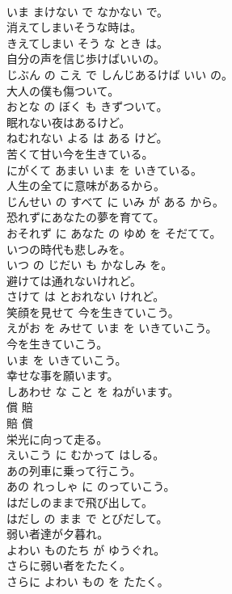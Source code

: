 \documentclass[8pt]{extreport}
\begin{document}
\begin{CJK}{UTF8}{min}
\\	いま まけない で なかない で。	
\\	消えてしまいそうな時は。	
\\	きえてしまい そう な とき は。	
\\	自分の声を信じ歩けばいいの。	
\\	じぶん の こえ で しんじあるけば いい の。	
\\	大人の僕も傷ついて。	
\\	おとな の ぼく も きずついて。	
\\	眠れない夜はあるけど。	
\\	ねむれない よる は ある けど。	
\\	苦くて甘い今を生きている。	
\\	にがくて あまい いま を いきている。	
\\	人生の全てに意味があるから。	
\\	じんせい の すべて に いみ が ある から。	
\\	恐れずにあなたの夢を育てて。	
\\	おそれず に あなた の ゆめ を そだてて。	
\\	いつの時代も悲しみを。	
\\	いつ の じだい も かなしみ を。	
\\	避けては通れないけれど。	
\\	さけて は とおれない けれど。	
\\	笑顔を見せて 今を生きていこう。	
\\	えがお を みせて いま を いきていこう。	
\\	今を生きていこう。	
\\	いま を いきていこう。	
\\	幸せな事を願います。	
\\	しあわせ な こと を ねがいます。	
\\	償	賠	
\\	賠	償	
\\	栄光に向って走る。	
\\	えいこう に むかって はしる。	
\\	あの列車に乗って行こう。	
\\	あの れっしゃ に のっていこう。	
\\	はだしのままで飛び出して。	
\\	はだし の まま で とびだして。	
\\	弱い者達が夕暮れ。	
\\	よわい ものたち が ゆうぐれ。	
\\	さらに弱い者をたたく。	
\\	さらに よわい もの を たたく。	

\end{CJK}
\end{document}

